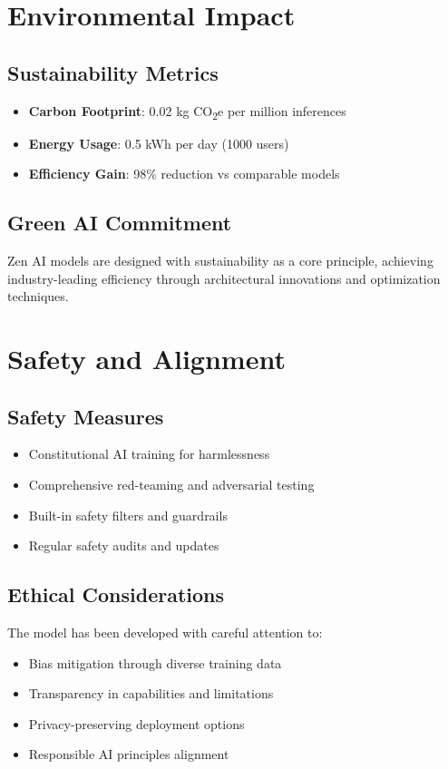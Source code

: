 \documentclass[11pt,a4paper]{article}
\begin{document}
\section{Environmental Impact}

\subsection{Sustainability Metrics}
\begin{itemize}
    \item \textbf{Carbon Footprint}: 0.02 kg CO\textsubscript{2}e per million inferences
    \item \textbf{Energy Usage}: 0.5 kWh per day (1000 users)
    \item \textbf{Efficiency Gain}: 98\% reduction vs comparable models
\end{itemize}

\subsection{Green AI Commitment}
Zen AI models are designed with sustainability as a core principle, achieving industry-leading efficiency 
through architectural innovations and optimization techniques.

\section{Safety and Alignment}

\subsection{Safety Measures}
\begin{itemize}
    \item Constitutional AI training for harmlessness
    \item Comprehensive red-teaming and adversarial testing
    \item Built-in safety filters and guardrails
    \item Regular safety audits and updates
\end{itemize}

\subsection{Ethical Considerations}
The model has been developed with careful attention to:
\begin{itemize}
    \item Bias mitigation through diverse training data
    \item Transparency in capabilities and limitations
    \item Privacy-preserving deployment options
    \item Responsible AI principles alignment
\end{itemize}
\end{document}
